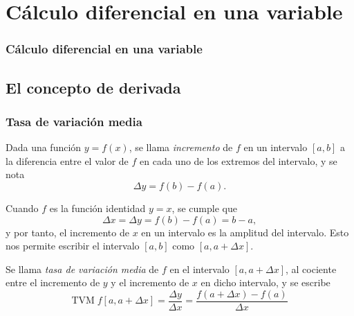\section{Cálculo diferencial en una variable} 
\begin{frame}
\frametitle{Cálculo diferencial en una variable}
\tableofcontents[sectionstyle=show/hide,hideothersubsections]
\end{frame}


\subsection{El concepto de derivada}
\begin{frame}
\frametitle{Tasa de variación media}
\begin{definicion}[Incremento]
Dada una función $y=f(x)$, se llama \emph{incremento} de $f$ en un intervalo $[a,b]$ a la diferencia entre el valor de $f$ en cada uno de los extremos del intervalo, y se nota
\[\Delta y= f(b)-f(a).\]
\end{definicion}

Cuando $f$ es la función identidad $y=x$, se cumple que
\[\Delta x=\Delta y= f(b)-f(a)=b-a,\]
y por tanto, el incremento de $x$ en un intervalo es la amplitud del intervalo. Esto nos permite escribir el intervalo $[a,b]$ como $[a,a+\Delta x]$.

\begin{definicion}
Se llama \emph{tasa de variación media} de $f$ en el intervalo $[a,a+\Delta x]$, al cociente entre el incremento de $y$ y el incremento de $x$ en dicho intervalo, y se escribe
\[
\textrm{TVM}\;f[a,a+\Delta x]=\frac{\Delta y}{\Delta x}=\frac{f(a+\Delta x)-f(a)}{\Delta x} 
\]
\end{definicion}
\end{frame}


